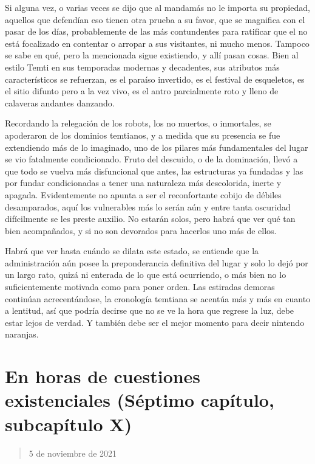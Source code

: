 \documentclass[
  spanish,
]{book}
\begin{document}
Si alguna vez, o varias veces se dijo que al mandamás no le importa su propiedad, aquellos que defendían eso tienen otra prueba a su favor, que se magnifica con el pasar de los días, probablemente de las más contundentes para ratificar que el no está focalizado en contentar o arropar a sus visitantes, ni mucho menos. Tampoco se sabe en qué, pero la mencionada sigue existiendo, y allí pasan cosas. Bien al estilo Temti en sus temporadas modernas y decadentes, sus atributos más característicos se refuerzan, es el paraíso invertido, es el festival de esqueletos, es el sitio difunto pero a la vez vivo, es el antro parcialmente roto y lleno de calaveras andantes danzando.

Recordando la relegación de los robots, los no muertos, o inmortales, se apoderaron de los dominios temtianos, y a medida que su presencia se fue extendiendo más de lo imaginado, uno de los pilares más fundamentales del lugar se vio fatalmente condicionado. Fruto del descuido, o de la dominación, llevó a que todo se vuelva más disfuncional que antes, las estructuras ya fundadas y las por fundar condicionadas a tener una naturaleza más descolorida, inerte y apagada. Evidentemente no apunta a ser el reconfortante cobijo de débiles desamparados, aquí los vulnerables más lo serán aún y entre tanta oscuridad difícilmente se les preste auxilio. No estarán solos, pero habrá que ver qué tan bien acompañados, y si no son devorados para hacerlos uno más de ellos.

Habrá que ver hasta cuándo se dilata este estado, se entiende que la administración aún posee la preponderancia definitiva del lugar y solo lo dejó por un largo rato, quizá ni enterada de lo que está ocurriendo, o más bien no lo suficientemente motivada como para poner orden. Las estiradas demoras continúan acrecentándose, la cronología temtiana se acentúa más y más en cuanto a lentitud, así que podría decirse que no se ve la hora que regrese la luz, debe estar lejos de verdad. Y también debe ser el mejor momento para decir nintendo naranjas.

\hypertarget{en-horas-de-cuestiones-existenciales-suxe9ptimo-capuxedtulo-subcapuxedtulo-x}{%
\section{En horas de cuestiones existenciales (Séptimo capítulo, subcapítulo X)}\label{en-horas-de-cuestiones-existenciales-suxe9ptimo-capuxedtulo-subcapuxedtulo-x}}

\begin{quote}
5 de noviembre de 2021
\end{quote}
\end{document}
